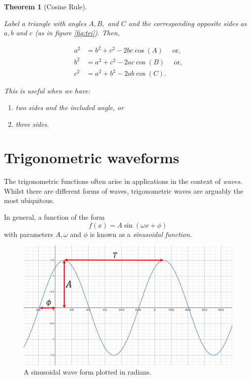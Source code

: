 \documentclass[
]{book}
\providecommand{\tightlist}{%
  \setlength{\itemsep}{0pt}\setlength{\parskip}{0pt}}
\newtheorem{theorem}{Theorem}[chapter]
\theoremstyle{definition}
\theoremstyle{definition}
\theoremstyle{definition}
\theoremstyle{definition}
\theoremstyle{remark}
\begin{document}
\begin{theorem}[Cosine Rule]
\protect\hypertarget{thm:cosinerule}{}\label{thm:cosinerule}

Label a triangle with angles \(A, B,\) and \(C\) and the corresponding opposite sides as \(a, b\) and \(c\) (as in figure \ref{fig:tri}). Then,

\begin{align*}
a^2&= b^2 +c^2 -2bc\cos(A)\quad\text{ or,}\\
b^2&=a^2+c^2-2ac\cos(B)\quad\text{ or,}\\
c^2&=a^2+b^2-2ab\cos(C).
\end{align*}

This is useful when we have:

\begin{enumerate}
\def\labelenumi{\arabic{enumi}.}
\tightlist
\item
  two sides and the included angle, or
\item
  three sides.
\end{enumerate}

\end{theorem}

\hypertarget{trigonometric-waveforms}{%
\section{Trigonometric waveforms}\label{trigonometric-waveforms}}

The trigonometric functions often arise in applications in the context of \emph{waves}. Whilst there are different forms of waves, trigonometric waves are arguably the most ubiquitous.

In general, a function of the form
\[
f(x)=A\sin(\omega x + \phi)
\]
with parameters \(A,\omega\) and \(\phi\) is known as a \emph{sinusoidal function}.

\begin{figure}
\includegraphics{figures/sinusoid} \caption{A sinusoidal wave form plotted in radians.}\label{fig:sinusoid}
\end{figure}
\end{document}
